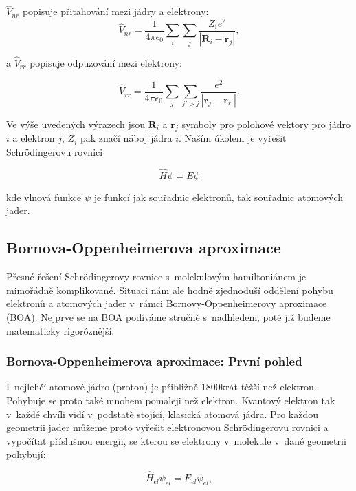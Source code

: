 \noindent $\hat{V}_{nr}$ popisuje přitahování mezi jádry a elektrony:
\begin{equation}
\hat{V}_{nr}=\frac{1}{4\pi\epsilon_0}\sum_i\sum_j\frac{Z_i e^2}{ \left\vert \textbf{R}_i - \textbf{r}_j\right\vert } , 	
\end{equation}

\noindent a $\hat{V}_{rr}$ popisuje odpuzování mezi elektrony:

\begin{equation}
\hat{V}_{rr}=\frac{1}{4\pi\epsilon_0}\sum_j\sum_{j'>j}\frac{ e^2}{ \left\vert \textbf{r}_j - \textbf{r}_{r'}\right\vert }. 	
\end{equation}

\noindent Ve výše uvedených výrazech jsou $\textbf{R}_i$ a $\textbf{r}_j$ symboly pro polohové vektory pro jádro $i$ a elektron $j$, $Z_i$ pak značí náboj jádra $i$. Naším úkolem je vyřešit Schrödingerovu rovnici

\begin{equation}
\hat{H}\psi=E\psi
\end{equation}

\noindent kde vlnová funkce $\psi$ je funkcí jak souřadnic elektronů, tak souřadnic atomových jader. 

\subsection{Bornova-Oppenheimerova aproximace}

Přesné řešení Schrödingerovy rovnice s~molekulovým hamiltoniánem je mimořádně komplikované. Situaci nám ale hodně zjednoduší oddělení pohybu elektronů a atomových jader v~rámci Bornovy-Oppenheimerovy aproximace (BOA). Nejprve se na BOA podíváme stručně s~nadhledem, poté již budeme matematicky rigoróznější. 

\subsubsection{Bornova-Oppenheimerova aproximace: První pohled}


I~nejlehčí atomové jádro (proton) je přibližně 1800krát těžší než elektron.  Pohybuje se proto také mnohem pomaleji než elektron. Kvantový elektron tak v~každé chvíli vidí v~podstatě stojící, klasická atomová jádra. Pro každou geometrii jader můžeme proto vyřešit elektronovou Schrödingerovu rovnici a vypočítat příslušnou energii, se kterou se elektrony v~molekule v~dané geometrii pohybují:

\begin{equation}
\hat{H}_{el}\psi_{el}=E_{el}\psi_{el},
\end{equation}

